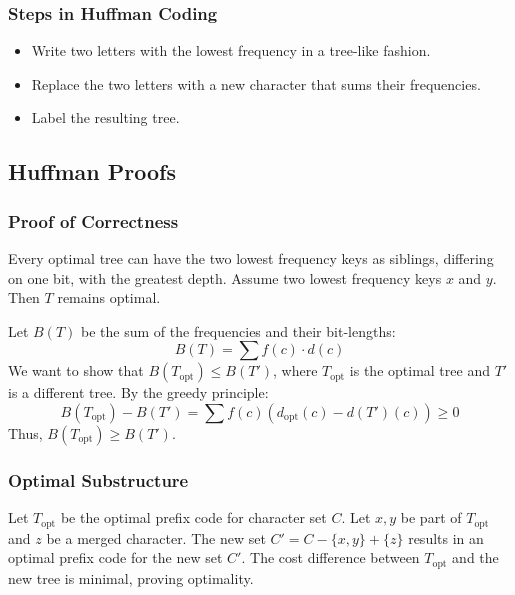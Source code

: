 \subsubsection{Steps in Huffman Coding}
\begin{itemize}
    \item Write two letters with the lowest frequency in a tree-like fashion.
    \item Replace the two letters with a new character that sums their frequencies.
    \item Label the resulting tree.
\end{itemize}

\subsection{Huffman Proofs}

\subsubsection{Proof of Correctness}
\begin{theorem}
Every optimal tree can have the two lowest frequency keys as siblings, differing on one bit, with the greatest depth. Assume two lowest frequency keys $x$ and $y$. Then $T$ remains optimal.
\end{theorem}

Let $B(T)$ be the sum of the frequencies and their bit-lengths:
\[
B(T) = \sum f(c) \cdot d(c)
\]
We want to show that $B(T_{\text{opt}}) \leq B(T')$, where $T_{\text{opt}}$ is the optimal tree and $T'$ is a different tree. By the greedy principle:
\[
B(T_{\text{opt}}) - B(T') = \sum f(c)(d_{\text{opt}}(c) - d(T')(c)) \geq 0
\]
Thus, $B(T_{\text{opt}}) \geq B(T')$.

\subsubsection{Optimal Substructure}
\begin{theorem}
Let $T_{\text{opt}}$ be the optimal prefix code for character set $C$. Let $x, y$ be part of $T_{\text{opt}}$ and $z$ be a merged character. The new set $C' = C - \{x, y\} + \{z\}$ results in an optimal prefix code for the new set $C'$. The cost difference between $T_{\text{opt}}$ and the new tree is minimal, proving optimality.
\end{theorem}